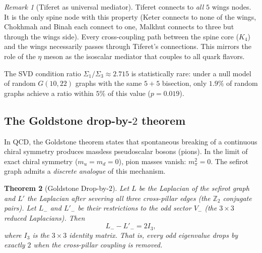 \documentclass[11pt,a4paper]{amsart}
\newtheorem{theorem}{Theorem}[section]
\theoremstyle{remark}
\newtheorem{remark}[theorem]{Remark}
\newcommand{\bbZ}{\mathbb{Z}}
\begin{document}
\begin{remark}[Tiferet as universal mediator]
Tiferet connects to \emph{all $5$} wings nodes. It is the only spine node
with this property (Keter connects to none of the wings, Chokhmah and Binah
each connect to one, Malkhut connects to three but through the wings side).
Every cross-coupling path between the spine core ($K_4$) and the wings
necessarily passes through Tiferet's connections. This mirrors the role of
the $\eta$ meson as the isoscalar mediator that couples to all quark
flavors.
\end{remark}

The SVD condition ratio $\Sigma_1 / \Sigma_3 \approx 2.715$ is statistically
rare: under a null model of random $G(10, 22)$ graphs with the same
$5 + 5$ bisection, only $1.9\%$ of random graphs achieve a ratio within
$5\%$ of this value ($p = 0.019$).

\subsection{The Goldstone drop-by-$2$ theorem}
\label{sec:goldstone}

In QCD, the Goldstone theorem states that spontaneous breaking of a
continuous chiral symmetry produces massless pseudoscalar bosons (pions).
In the limit of exact chiral symmetry ($m_u = m_d = 0$), pion masses
vanish: $m_\pi^2 = 0$. The sefirot graph admits a \emph{discrete analogue}
of this mechanism.

\begin{theorem}[Goldstone Drop-by-$2$]
\label{thm:goldstone}
Let $L$ be the Laplacian of the sefirot graph and $L'$ the Laplacian after
severing all three cross-pillar edges (the $\bbZ_2$ conjugate pairs). Let
$L_-$ and $L'_-$ be their restrictions to the odd sector $V_-$ (the
$3 \times 3$ reduced Laplacians). Then
\begin{equation}
L_- - L'_- = 2 I_3,
\end{equation}
where $I_3$ is the $3 \times 3$ identity matrix. That is, every odd
eigenvalue drops by exactly $2$ when the cross-pillar coupling is removed.
\end{theorem}
\end{document}
